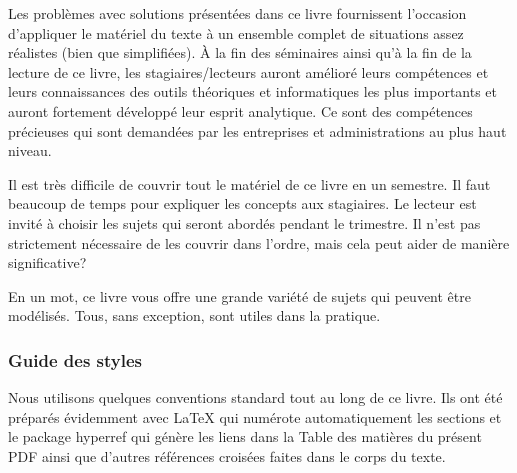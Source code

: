 	Les problèmes avec solutions pr\'esent\'ees dans ce livre fournissent l'occasion d'appliquer le mat\'eriel du texte à un ensemble complet de situations assez r\'ealistes (bien que simplifi\'ees). À la fin des s\'eminaires ainsi qu'à la fin de la lecture de ce livre, les stagiaires/lecteurs auront am\'elior\'e leurs comp\'etences et leurs connaissances des outils th\'eoriques et informatiques les plus importants et auront fortement d\'evelopp\'e leur esprit analytique. Ce sont des comp\'etences pr\'ecieuses qui sont demand\'ees par les entreprises et administrations au plus haut niveau.

	Il est très difficile de couvrir tout le mat\'eriel de ce livre en un semestre. Il faut beaucoup de temps pour expliquer les concepts aux stagiaires. Le lecteur est invit\'e à choisir les sujets qui seront abord\'es pendant le trimestre. Il n'est pas strictement n\'ecessaire de les couvrir dans l'ordre, mais cela peut aider de manière significative?

	En un mot, ce livre vous offre une grande vari\'et\'e de sujets qui peuvent être mod\'elis\'es. Tous, sans exception, sont utiles dans la pratique.
	
	\subsubsection{Guide des styles}
	Nous utilisons quelques conventions standard tout au long de ce livre. Ils ont été préparés évidemment avec \LaTeX{} qui numérote automatiquement les sections et le package hyperref qui génère les liens dans la Table des matières du présent PDF ainsi que d'autres références croisées faites dans le corps du texte.

